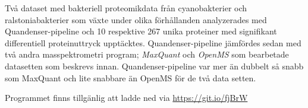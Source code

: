 Två dataset med bakteriell proteomikdata från cyanobakterier och ralstoniabakterier som växte under olika förhållanden analyzerades med Quandenser-pipeline och 10 respektive 267 unika proteiner med signifikant differentiell proteinuttryck upptäcktes. Quandenser-pipeline jämfördes sedan med två andra masspektrometri program; \textit{MaxQuant} och \textit{OpenMS} som bearbetade datasetten som beskrevs innan. Quandenser-pipeline var mer än dubbelt så snabb som MaxQuant och lite snabbare än OpenMS för de två data setten.

Programmet finns tillgänlig att ladde ned via \url{https://git.io/fjBrW}
